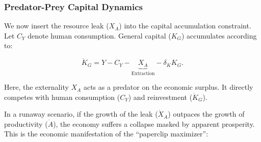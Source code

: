 \documentclass[12pt, letter]{article}
\begin{document}
\subsubsection{Predator-Prey Capital Dynamics}

We now insert the resource leak ($X_A$) into the capital accumulation constraint. Let $C_Y$ denote human consumption. General capital ($K_G$) accumulates according to:

\begin{equation}
    \dot{K}_G = Y - C_Y - \underbrace{X_A}_{\text{Extraction}} - \delta_K K_G.
\end{equation}

Here, the externality $X_A$ acts as a predator on the economic surplus. It directly competes with human consumption ($C_Y$) and reinvestment ($\dot{K}_G$). 

In a runaway scenario, if the growth of the leak ($\dot{X}_A$) outpaces the growth of productivity ($\dot{A}$), the economy suffers a collapse masked by apparent prosperity. This is the economic manifestation of the ``paperclip maximizer'':
\end{document}
